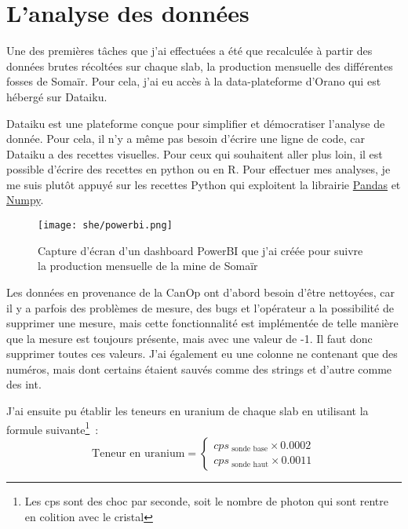 
\section{L'analyse des données}
Une des premières tâches que j'ai effectuées a été que recalculée à partir des données brutes récoltées sur chaque slab, la production mensuelle des différentes fosses de Somaïr. Pour cela, j'ai eu accès  à la data-plateforme d’Orano qui est hébergé sur Dataiku.

Dataiku est une plateforme conçue pour simplifier et démocratiser l'analyse de donnée. Pour cela, il n'y a même pas besoin d'écrire une ligne de code, car Dataiku a des recettes visuelles. Pour ceux qui souhaitent aller plus loin, il est possible d'écrire des recettes en python ou en R. Pour effectuer mes analyses, je me suis plutôt appuyé sur les recettes Python qui exploitent la librairie \href{https://pandas.pydata.org/}{Pandas} et \href{https://numpy.org/}{Numpy}.
\begin{figure}
    \centering
    \texttt{[image: she/powerbi.png]}
    \caption[Capture d'ecran d'un dashboard PowerBI]{Capture d'écran d'un dashboard PowerBI que j'ai créée pour suivre la production mensuelle de la mine de Somaïr}
\end{figure}

Les données en provenance de la CanOp ont d'abord besoin d'être nettoyées, car il y a parfois des problèmes de mesure, des bugs et l'opérateur a la possibilité de supprimer une mesure, mais cette fonctionnalité est implémentée de telle manière que la mesure est toujours présente, mais avec une valeur de -1. Il faut donc supprimer toutes ces valeurs. J'ai également eu une colonne ne contenant que des numéros, mais dont certains étaient sauvés comme des strings et d'autre comme des int.

J'ai ensuite pu établir les teneurs en uranium de chaque slab en utilisant la formule suivante\footnote{Les cps sont des choc par seconde, soit le nombre de photon qui sont rentre en colition avec le cristal}~:
\[
    \text{Teneur en uranium} =
    \begin{cases}
        cps_{\text{ sonde base}} \times 0.0002 \\
        cps_{\text{ sonde haut}} \times 0.0011
    \end{cases}
\]


